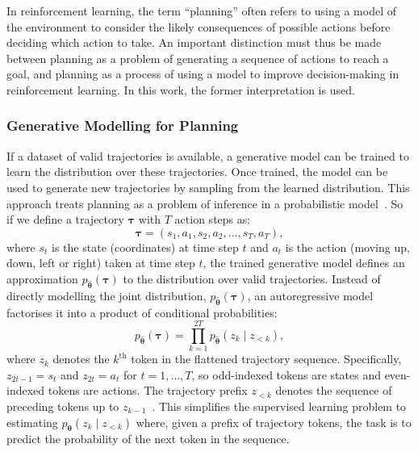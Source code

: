 ﻿\documentclass[12pt,a4paper]{article}
\let\oldcite\cite
\renewcommand{\cite}[1]{\mbox{\oldcite{#1}}}
\theoremstyle{definition}
\begin{document}
In reinforcement learning, the term ``planning'' often refers to using a model of the environment to 
consider the likely consequences of possible actions before deciding which action to take. 
An important distinction must thus be made between
planning as a problem of generating a sequence of actions to reach a goal, and planning as a 
process of using a model to improve decision-making in reinforcement learning. In this 
work, the former interpretation is used.

\subsubsection{Generative Modelling for Planning}

If a dataset of valid trajectories is available, a generative model can be trained to learn the distribution over these trajectories. Once trained, the model can be used to generate new trajectories by sampling from the learned distribution. This approach treats planning as a problem of inference in a probabilistic model~\cite{janner2021trajectory}.
So if we define a trajectory $\boldsymbol{\tau}$ with $T$ action steps as: 
\begin{equation}
\boldsymbol{\tau} = (s_1, a_1, s_2, a_2, \dots, s_T, a_T),
\end{equation}
where $s_t$ is the state (coordinates) at time step $t$ and $a_t$ is the action (moving up, down, left or right) taken at time step $t$, the trained generative model defines an approximation $p_{\hat{\boldsymbol{\theta}}}(\boldsymbol{\tau})$ to the distribution over valid trajectories.
Instead of directly modelling the joint distribution, $p_{\hat{\boldsymbol{\theta}}}(\boldsymbol{\tau})$, an autoregressive model factorises it into a product of conditional probabilities:
\begin{equation}
p_{\hat{\boldsymbol{\theta}}}(\boldsymbol{\tau}) = \prod_{k=1}^{2T} p_{\hat{\boldsymbol{\theta}}}(z_k \mid z_{<k}),
\label{eq:autoregressive_generative_model}
\end{equation}
where $z_k$ denotes the $k^{\text{th}}$ token in the flattened trajectory sequence.
Specifically, $z_{2t-1}=s_t$ and $z_{2t}=a_t$ for $t=1,\ldots,T$, so odd-indexed
tokens are states and even-indexed tokens are actions. The trajectory prefix
$z_{<k}$ denotes the sequence of preceding tokens up to $z_{k-1}$~\cite{goodfellow2016deep}.
This simplifies the supervised learning problem to estimating $p_{\boldsymbol{\theta}}(z_k \mid z_{<k})$ where, given a prefix 
of trajectory tokens, the task is to predict the probability of the next token in the sequence. 
\end{document}
